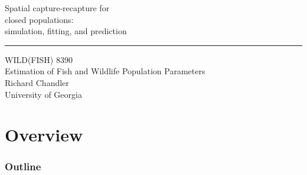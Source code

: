 \documentclass[color=usenames,dvipsnames]{beamer}\usepackage[]{graphicx}\usepackage[]{color}
\begin{document}
\begin{frame}[plain]
  \LARGE
  \centering
  {
    \LARGE Spatial capture-recapture %
    for \\ closed populations: \\
    \Large simulation, fitting, and prediction \\
  }
  {\color{default} \rule{\textwidth}{0.1pt} }
  \vfill
  \large
  WILD(FISH) 8390 \\
  Estimation of Fish and Wildlife Population Parameters \\
  \vfill
  \large
  Richard Chandler \\
  University of Georgia \\
\end{frame}






\section{Overview}



\begin{frame}[plain]
  \frametitle{Outline}
  \Large
\end{frame}
\end{document}

